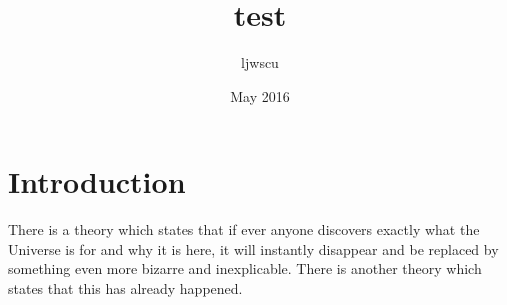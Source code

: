 \documentclass{article}
\title{test}
\author{ljwscu }
\date{May 2016}
\begin{document}
\section{Introduction}
There is a theory which states that if ever anyone discovers exactly what the Universe is for and why it is here, it will instantly disappear and be replaced by something even more bizarre and inexplicable.
There is another theory which states that this has already happened.
 
\end{document}
